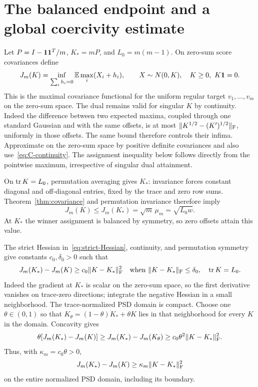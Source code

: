 \section{The balanced endpoint and a global coercivity estimate}
Let $P=I-\mathbf 1\mathbf 1^T/m$, $K_*=mP$, and $L_0=m(m-1)$. On zero-sum score
covariances define
\[
 J_m(K)=\inf_{\sum_i h_i=0}\mathbb E\max_i(X_i+h_i),\qquad
 X\sim N(0,K),\quad K\geq0,\ K\mathbf 1=0.
\]
This is the maximal covariance functional for the uniform regular target
$v_1,\ldots,v_m$ on the zero-sum space. The dual remains valid for singular
$K$ by continuity. Indeed the difference between two expected maxima,
coupled through one standard Gaussian and with the same offsets, is at most
$\lVert K^{1/2}-(K')^{1/2}\rVert_{\mathrm F}$, uniformly in those offsets. The same bound
therefore controls their infima. Approximate on the zero-sum space by positive
definite covariances and also use~\eqref{eq:C-continuity}.
The assignment inequality below follows directly from the pointwise maximum,
irrespective of singular dual attainment.

On $\operatorname{tr} K=L_0$, permutation averaging gives $K_*$: invariance forces constant
diagonal and off-diagonal entries, fixed by the trace and zero row sums.
Theorem~\ref{thm:covariance} and permutation invariance therefore imply
\begin{equation}\label{eq:score-maximum}
 J_m(K)\leq J_m(K_*)=\sqrt m\,\mu_m=\sqrt{L_0w}.
\end{equation}
At $K_*$ the winner assignment is balanced by symmetry, so zero offsets
attain this value.

The strict Hessian in~\eqref{eq:strict-Hessian}, continuity, and permutation
symmetry give constants $c_0,\delta_0>0$ such that
\[
 J_m(K_*)-J_m(K)\geq c_0\lVert K-K_*\rVert_{\mathrm F}^2
 \quad\hbox{when }\lVert K-K_*\rVert_{\mathrm F}\leq\delta_0,\quad \operatorname{tr} K=L_0.
\]
Indeed the gradient at $K_*$ is scalar on the zero-sum space, so the first
derivative vanishes on trace-zero directions; integrate the negative Hessian
in a small neighborhood. The trace-normalized PSD domain is compact. Choose
one $\theta\in(0,1)$ so that
$K_\theta=(1-\theta)K_*+\theta K$ lies in that neighborhood for every $K$
in the domain. Concavity gives
\[
 \theta[J_m(K_*)-J_m(K)]
 \geq J_m(K_*)-J_m(K_\theta)
 \geq c_0\theta^2\lVert K-K_*\rVert_{\mathrm F}^2.
\]
Thus, with $\kappa_m=c_0\theta>0$,
\begin{equation}\label{eq:global-Gram-gap}
 J_m(K_*)-J_m(K)\geq\kappa_m\lVert K-K_*\rVert_{\mathrm F}^2
\end{equation}
on the entire normalized PSD domain, including its boundary.

